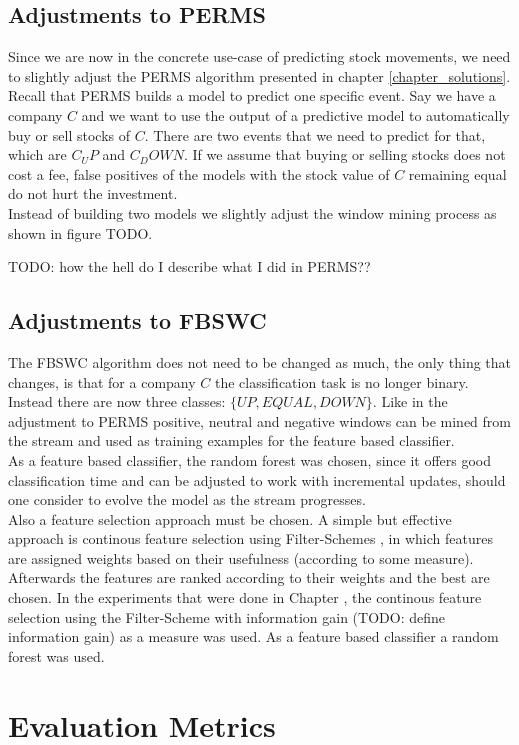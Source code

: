 \subsection{Adjustments to PERMS}
Since we are now in the concrete use-case of predicting stock movements, we need to slightly adjust the PERMS algorithm presented in chapter \ref{chapter_solutions}. Recall that PERMS builds a model to predict one specific event. Say we have a company $C$ and we want to use the output of a predictive model to automatically buy or sell stocks of $C$. There are two events that we need to predict for that, which are $C_UP$ and $C_DOWN$. If we assume that buying or selling stocks does not cost a fee, false positives of the models with the stock value of $C$ remaining equal do not hurt the investment. \\
Instead of building two models we slightly adjust the window mining process as shown in figure TODO.

 TODO: how the hell do I describe what I did in PERMS??

\subsection{Adjustments to FBSWC}
The FBSWC algorithm does not need to be changed as much, the only thing that changes, is that for a company $C$ the classification task is no longer binary. Instead there are now three classes: $\{UP,EQUAL,DOWN\}$. Like in the adjustment to PERMS positive, neutral and negative windows can be mined from the stream and used as training examples for the feature based classifier. \\
As a feature based classifier, the random forest was chosen, since it offers good classification time and can be adjusted to work with incremental updates, should one consider to evolve the model as the stream progresses.\\
Also a feature selection approach must be chosen. A simple but effective approach is continous feature selection using Filter-Schemes \cite{molina2002feature}, in which features are assigned weights based on their usefulness (according to some measure). Afterwards the features are ranked according to their weights and the best are chosen. In the experiments that were done in Chapter , the continous feature selection using the Filter-Scheme with information gain (TODO: define information gain) as a measure was used. As a feature based classifier a random forest was used.

\section{Evaluation Metrics}
\label{sec_evaluationMetrics}

